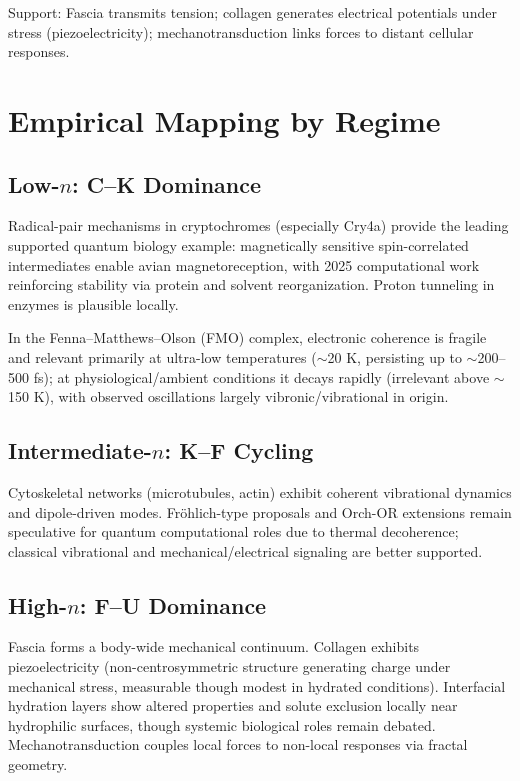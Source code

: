 \documentclass{article}
\begin{document}
Support: Fascia transmits tension; collagen generates electrical potentials under stress (piezoelectricity); mechanotransduction links forces to distant cellular responses.

\section{Empirical Mapping by Regime}

\subsection{Low-\(n\): C--K Dominance}
Radical-pair mechanisms in cryptochromes (especially Cry4a) provide the leading supported quantum biology example: magnetically sensitive spin-correlated intermediates enable avian magnetoreception, with 2025 computational work reinforcing stability via protein and solvent reorganization. Proton tunneling in enzymes is plausible locally.

In the Fenna--Matthews--Olson (FMO) complex, electronic coherence is fragile and relevant primarily at ultra-low temperatures ($\sim$20 K, persisting up to $\sim$200--500 fs); at physiological/ambient conditions it decays rapidly (irrelevant above $\sim$150 K), with observed oscillations largely vibronic/vibrational in origin.

\subsection{Intermediate-\(n\): K--F Cycling}
Cytoskeletal networks (microtubules, actin) exhibit coherent vibrational dynamics and dipole-driven modes. Fröhlich-type proposals and Orch-OR extensions remain speculative for quantum computational roles due to thermal decoherence; classical vibrational and mechanical/electrical signaling are better supported.

\subsection{High-\(n\): F--U Dominance}
Fascia forms a body-wide mechanical continuum. Collagen exhibits piezoelectricity (non-centrosymmetric structure generating charge under mechanical stress, measurable though modest in hydrated conditions). Interfacial hydration layers show altered properties and solute exclusion locally near hydrophilic surfaces, though systemic biological roles remain debated. Mechanotransduction couples local forces to non-local responses via fractal geometry.
\end{document}
